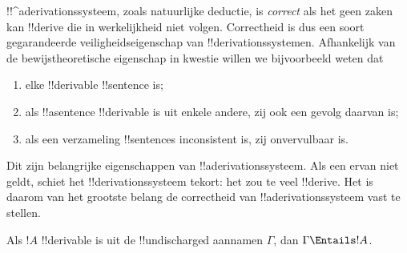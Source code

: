 \documentclass[../../../include/open-logic-section]{subfiles}
\begin{document}
      {}
      {}
      

\begin{explain}
!!^a{derivation}ssysteem, zoals natuurlijke deductie, is
\emph{correct} als het geen zaken kan !!{derive} die in werkelijkheid
niet volgen. Correctheid is dus een soort gegarandeerde
veiligheidseigenschap van !!{derivation}ssystemen. Afhankelijk van de
bewijstheoretische eigenschap in kwestie willen we bijvoorbeeld weten
dat
\begin{enumerate}
\item elke !!{derivable} !!{sentence}  is;
\item als !!a{sentence} !!{derivable} is uit enkele andere, zij ook een
  gevolg daarvan is;
\item als een verzameling !!{sentence}s inconsistent is, zij
  onvervulbaar is.
\end{enumerate}
Dit zijn belangrijke eigenschappen van !!a{derivation}ssysteem. Als
een ervan niet geldt, schiet het !!{derivation}ssysteem tekort: het zou
te veel !!{derive}. Het is daarom van het grootste belang de
correctheid van !!a{derivation}ssysteem vast te stellen.
\end{explain}

\begin{thm}[Correctheid]
Als $!A$ !!{derivable} is uit de !!{undischarged} aannamen
$\Gamma$, dan $\Gamma \Entails !A$.
\end{thm}
\end{document}
